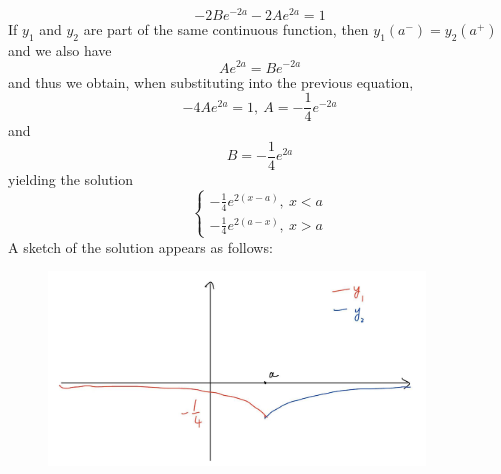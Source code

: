 \documentclass{article}
\begin{document}
\begin{equation*}
    -2Be^{-2a} - 2Ae^{2a} = 1
\end{equation*}
If $y_1$ and $y_2$ are part of the same continuous function, then $y_1(a^-)=y_2(a^+)$ and we also have 
\begin{equation*}
    Ae^{2a} = Be^{-2a}
\end{equation*}
and thus we obtain, when substituting into the previous equation, 
\begin{equation*}
    -4Ae^{2a}=1,\ A = -\frac{1}{4}e^{-2a}
\end{equation*}
and 
\begin{equation*}
    B = -\frac{1}{4}e^{2a}
\end{equation*}
yielding the solution
\begin{equation*}
    \begin{cases}
        -\frac{1}{4}e^{2(x-a)},\ x < a \\
        -\frac{1}{4}e^{2(a-x)},\ x >a
    \end{cases}
\end{equation*}
A sketch of the solution appears as follows:
\begin{figure}[h]
    \centering
    \includegraphics[width=10cm]{DE-ch3-11.jpg}
\end{figure}

\hrulefill
\end{document}
